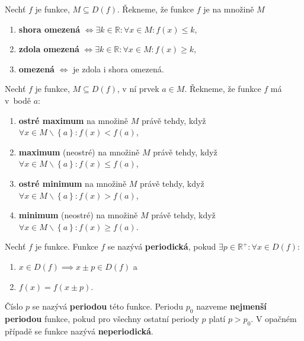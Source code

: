 \begin{definition}
  Nechť $f$ je funkce, $M\subseteq D(f)$. Řekneme, že funkce $f$ je na množině $M$
  \begin{enumerate}[$i.$]
    \item \textbf{shora omezená} $\iff \exists k \in \mathbb R: \forall x \in M: f(x)\leq k,$
    \item \textbf{zdola omezená} $\iff \exists k \in \mathbb R: \forall x \in M: f(x)\geq k,$
    \item \textbf{omezená} $\iff $ je zdola i shora omezená.
  \end{enumerate}
\end{definition}

\begin{definition}
  Nechť $f$ je funkce, $M \subseteq D(f)$, v ní prvek $a \in M$.
  Řekneme, že funkce $f$ má v~bodě $a$:
  \begin{enumerate}[$i.$]
    \item \textbf{ostré maximum} na množině $M$ právě tehdy, když $\forall x \in M\smallsetminus \left \{ a \right \}  : f(x) < f(a)$,
    \item \textbf{maximum} (neostré) na množině $M$ právě tehdy, když $\forall x \in M \smallsetminus \left \{ a \right \}: f(x) \leq f(a)$,
    \item \textbf{ostré minimum} na množině $M$ právě tehdy, když $\forall x \in M\smallsetminus \left \{ a \right \}: f(x) > f(a)$,
    \item \textbf{minimum} (neostré) na množině $M$ právě tehdy, když $\forall x \in M\smallsetminus \left \{ a \right \} : f(x) \geq f(a)$.
  \end{enumerate}
\end{definition}

\begin{definition}
  Nechť $f$ je funkce. Funkce $f$ se nazývá \textbf{periodická}, pokud $\exists p \in \mathbb R^{+}: \forall x \in D(f):$
  \begin{enumerate}
    \item $x \in D(f) \implies x \pm p \in D(f)$ a
    \item $f(x) = f(x \pm p)$.
  \end{enumerate}
  Číslo $p$ se nazývá \textbf{periodou} této funkce. Periodu $p_0$ nazveme \textbf{nejmenší periodou} funkce, pokud pro všechny ostatní periody $p$ platí $p > p_0$. V opačném případě se funkce nazývá \textbf{neperiodická}.
\end{definition}

